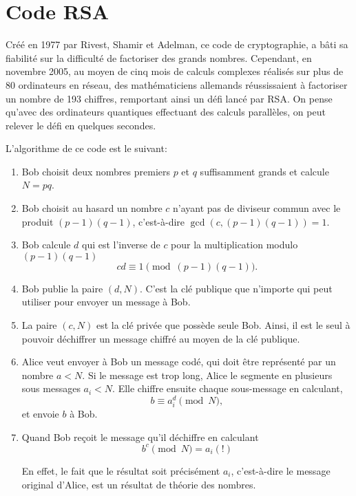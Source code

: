 \chapter{Code RSA}
\label{chap:RSA}
Créé en 1977 par Rivest, Shamir et Adelman, ce code de cryptographie, a bâti
sa fiabilité sur la difficulté de factoriser des grands nombres. Cependant, en
novembre 2005, au moyen de cinq mois de calculs complexes réalisés sur plus de
80 ordinateurs en réseau, des mathématiciens allemands réussissaient à
factoriser un nombre de 193 chiffres, remportant ainsi un défi lancé par RSA.
On pense qu'avec des ordinateurs quantiques effectuant des calculs parallèles,
on peut relever le défi en quelques secondes.

L'algorithme de ce code est le suivant:

\begin{enumerate}
\item Bob choisit deux nombres premiers $p$ et $q$ suffisamment grands et
calcule $N = pq$.

\item Bob choisit au hasard un nombre $c$ n'ayant pas de diviseur commun avec
le produit $(p-1)(q-1)$, c'est-à-dire $\gcd(c,(p-1)(q-1))=1$.

\item Bob calcule $d$ qui est l'inverse de $c$ pour la multiplication modulo
$(p-1)(q-1)$
\begin{equation}
cd\equiv1\pmod{(p-1)(q-1)}.
\end{equation}


\item Bob publie la paire $(d,N)$. C'est la clé publique que n'importe qui
peut utiliser pour envoyer un message à Bob.

\item La paire $(c,N)$ est la clé privée que possède seule Bob. Ainsi, il est
le seul à pouvoir déchiffrer un message chiffré au moyen de la clé publique.

\item Alice veut envoyer à Bob un message codé, qui doit être représenté par
un nombre $a<N$. Si le message est trop long, Alice le segmente en plusieurs
sous messages $a_i<N$. Elle chiffre ensuite chaque sous-message en
calculant,
\begin{equation}
b\equiv a_i^{d}\pmod{N},
\end{equation}
et envoie $b$ à Bob.

\item Quand Bob reçoit le message qu'il déchiffre en calculant
\begin{equation}
b^{c}\pmod{N}=a_i(!)
\end{equation}


En effet, le fait que le résultat soit précisément $a_i$, c'est-à-dire le
message original d'Alice, est un résultat de théorie des nombres.
\end{enumerate}

